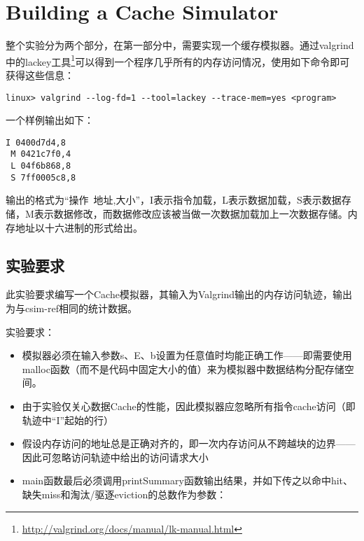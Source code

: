 \chapter{Building a Cache Simulator}
\label{cha:building_a_cache_simulator}
\par 整个实验分为两个部分，在第一部分中，需要实现一个缓存模拟器。通过valgrind中的lackey工具\footnote{\url{http://valgrind.org/docs/manual/lk-manual.html}}可以得到一个程序几乎所有的内存访问情况，使用如下命令即可获得这些信息：
\begin{lstlisting}[numbers=none]
linux> valgrind --log-fd=1 --tool=lackey --trace-mem=yes <program>
\end{lstlisting}

\par 一个样例输出如下：
\begin{lstlisting}[numbers=none]
I 0400d7d4,8
 M 0421c7f0,4
 L 04f6b868,8
 S 7ff0005c8,8
\end{lstlisting}

\par 输出的格式为``操作\ 地址,大小''，I表示指令加载，L表示数据加载，S表示数据存储，M表示数据修改，而数据修改应该被当做一次数据加载加上一次数据存储。内存地址以十六进制的形式给出。

\section{实验要求}
\label{sec:shi_yan_yao_qiu_}

\par 此实验要求编写一个Cache模拟器，其输入为Valgrind输出的内存访问轨迹，输出为与csim-ref相同的统计数据。

\par 实验要求：
\begin{itemize}
    \item 模拟器必须在输入参数s、E、b设置为任意值时均能正确工作——即需要使用malloc函数（而不是代码中固定大小的值）来为模拟器中数据结构分配存储空间。
    \item 由于实验仅关心数据Cache的性能，因此模拟器应忽略所有指令cache访问（即轨迹中“I”起始的行）
    \item 假设内存访问的地址总是正确对齐的，即一次内存访问从不跨越块的边界——因此可忽略访问轨迹中给出的访问请求大小
    \item main函数最后必须调用printSummary函数输出结果，并如下传之以命中hit、缺失miss和淘汰/驱逐eviction的总数作为参数：
\end{itemize}

